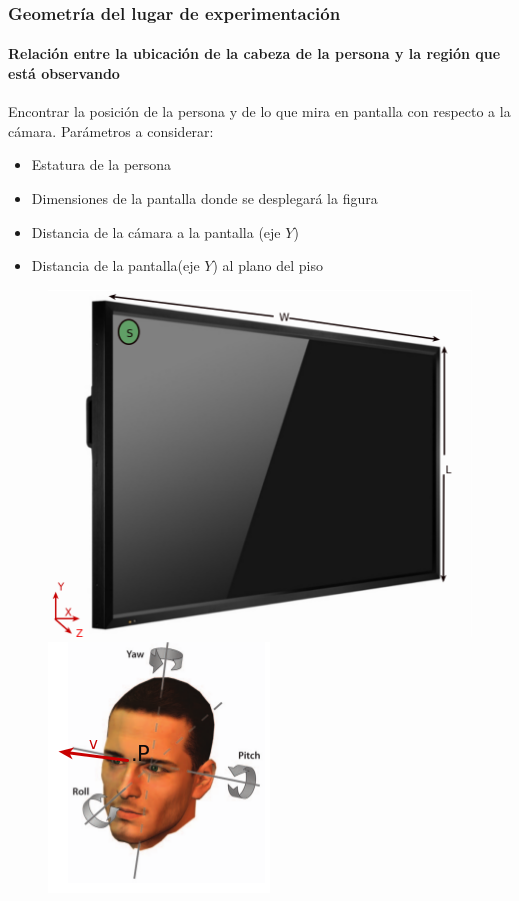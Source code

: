\documentclass[10pt, compress]{beamer}
\begin{document}
\begin{frame}[fragile]
\frametitle{Geometría del lugar de experimentación}
\framesubtitle{Relación entre la ubicación de la cabeza de la persona y la región que está observando}
\begin{block}{Encontrar la posición de la persona y de lo que mira en pantalla con respecto a la cámara.  Parámetros a considerar:}
	\begin{itemize}
		\item Estatura de la persona
		\item Dimensiones de la pantalla donde se desplegará la figura
		\item Distancia de la cámara a la pantalla (eje $Y$)
		\item Distancia de la pantalla(eje $Y$) al plano del piso
		
%
	\end{itemize}	
\end{block}
	 \begin{figure}[htbp] 
	 	\centering
	 	\includegraphics[width=.27\textwidth]{./pictures/pantalla2}
	 	\includegraphics[width=.28\textwidth]{./pictures/personaMirando}
	 \end{figure}
\end{frame}
\end{document}
